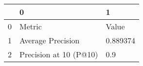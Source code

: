\begin{tabular}{lll}
\toprule
{} &                       0 &         1 \\
\midrule
0 &                  Metric &     Value \\
1 &       Average Precision &  0.889374 \\
2 &  Precision at 10 (P@10) &       0.9 \\
\bottomrule
\end{tabular}
